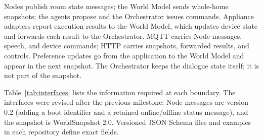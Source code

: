 \documentclass[conference]{IEEEtran}
\begin{document}
Nodes publish room state messages; the World Model sends whole-home
snapshots; the agents propose and the Orchestrator issues commands.
Appliance adapters report execution results to the World Model,
which updates device state and forwards each result to the
Orchestrator. MQTT carries Node messages, speech, and device
commands; HTTP carries snapshots, forwarded results, and controls.
Preference updates go from the application to the World Model and
appear in the next snapshot. The Orchestrator keeps the dialogue
state itself; it is not part of the snapshot.

Table~\ref{tab:interfaces} lists the information required at each
boundary. The interfaces were revised after the previous milestone:
Node messages are version 0.2 (adding a boot identifier and a
retained online/offline status message), and the snapshot is
WorldSnapshot 2.0. Versioned JSON Schema files and examples in each
repository define exact fields.
\end{document}
